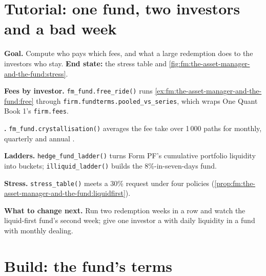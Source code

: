 \section{Tutorial: one fund, two investors and a bad week}\label{tut:fm:the-asset-manager-and-the-fund:tut}

\begin{tutorial}
\textbf{Goal.} Compute who pays which fees, and what a large redemption does to the investors who stay. \textbf{End state:} the stress table and
\cref{fig:fm:the-asset-manager-and-the-fund:stress}.
\begin{tutsteps}
\item \textbf{Fees by investor.} \texttt{fm\_fund.free\_ride()} runs \cref{ex:fm:the-asset-manager-and-the-fund:free} through
\texttt{firm.fundterms.pooled\_vs\_series}, which wraps One Quant Book 1's \texttt{firm.fees}.
\item \textbf{.} \texttt{fm\_fund.crystallisation()} averages the fee take over 1\,000 paths for monthly, quarterly and annual
.
\item \textbf{Ladders.} \texttt{hedge\_fund\_ladder()} turns Form PF's cumulative portfolio liquidity into buckets; \texttt{illiquid\_ladder()}
builds the 8\%-in-seven-days fund.
\item \textbf{Stress.} \texttt{stress\_table()} meets a 30\% request under four policies (\cref{prop:fm:the-asset-manager-and-the-fund:liquidfirst}).
\end{tutsteps}
\end{tutorial}

\textbf{What to change next.} Run two redemption weeks in a row and watch the liquid-first fund's second week; give one investor a  with
daily liquidity in a fund with monthly dealing.

\section{Build: the fund's terms}\label{bld:fm:the-asset-manager-and-the-fund:fundterms}

